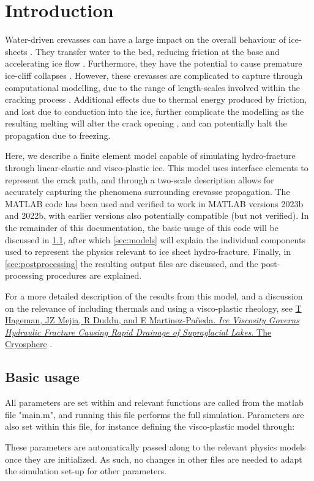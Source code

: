 \documentclass[3p]{elsarticle} %
\newcommand{\citeMe}{\href{https://doi.org/10.5194/egusphere-2024-346}{T Hageman, JZ Mejia, R Duddu, and E {Martinez-Pa{\~n}eda}. \textit{Ice Viscosity Governs Hydraulic Fracture Causing Rapid Drainage of Supraglacial Lakes}. The Cryosphere} \citep{Hageman}}
\begin{document}
\newpage
\tableofcontents

\newpage
{}
\section{Introduction}
Water-driven crevasses can have a large impact on the overall behaviour of ice-sheets \citep{Boon2003,Phillips2010a,Poinar2021,Krawczynski2009}. They transfer water to the bed, reducing friction at the base and accelerating ice flow \citep{Fountain2005,Smith2015,Dow2015}. Furthermore, they have the potential to cause premature ice-cliff collapses \citep{Scambos2009,McGrath2012,Buck2023}. However, these crevasses are complicated to capture through computational modelling, due to the range of length-scales involved within the cracking process \citep{Rice2015}. Additional effects due to thermal energy produced by friction, and lost due to conduction into the ice, further complicate the modelling as the resulting melting will alter the crack opening \citep{Andrews2022}, and can potentially halt the propagation due to freezing. 

Here, we describe a finite element model capable of simulating hydro-fracture through linear-elastic and visco-plastic ice. This model uses interface elements to represent the crack path, and through a two-scale description allows for accurately capturing the phenomena surrounding crevasse propagation. The MATLAB code has been used and verified to work in MATLAB versions 2023b and 2022b, with earlier versions also potentially compatible (but not verified). In the remainder of this documentation, the basic usage of this code will be discussed in \cref{sec:usage}, after which \cref{sec:models} will explain the individual components used to represent the physics relevant to ice sheet hydro-fracture. Finally, in \cref{sec:postprocessing} the resulting output files are discussed, and the post-processing procedures are explained. 

For a more detailed description of the results from this model, and a discussion on the relevance of including thermals and using a visco-plastic rheology, see \citeMe{}.

\subsection{Basic usage}
\label{sec:usage}
All parameters are set within and relevant functions are called from the matlab file "main.m", and running this file performs the full simulation. Parameters are also set within this file, for instance defining the visco-plastic model through:

These parameters are automatically passed along to the relevant physics models once they are initialized. As such, no changes in other files are needed to adapt the simulation set-up for other parameters. 
\end{document}

